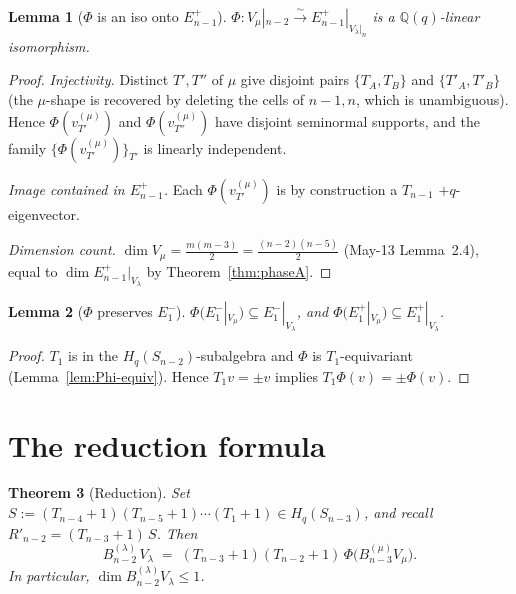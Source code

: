 \documentclass[11pt]{article}
\newtheorem{theorem}{Theorem}
\newtheorem{lemma}[theorem]{Lemma}
\theoremstyle{definition}
\begin{document}
\begin{lemma}[$\Phi$ is an iso onto $E_{n-1}^+$]\label{lem:Phi-iso}
$\Phi: V_\mu|_{n-2}\xrightarrow{\sim} E_{n-1}^+|_{V_\lambda|_n}$ is a
$\mathbb{Q}(q)$-linear isomorphism.
\end{lemma}

\begin{proof}
\emph{Injectivity.}  Distinct $T',T''$ of $\mu$ give disjoint pairs
$\{T_A,T_B\}$ and $\{T'_A,T'_B\}$ (the $\mu$-shape is recovered by
deleting the cells of $n-1,n$, which is unambiguous).  Hence
$\Phi(v_{T'}^{(\mu)})$ and $\Phi(v_{T''}^{(\mu)})$ have disjoint
seminormal supports, and the family $\{\Phi(v_{T'}^{(\mu)})\}_{T'}$
is linearly independent.

\emph{Image contained in $E_{n-1}^+$.}  Each $\Phi(v_{T'}^{(\mu)})$
is by construction a $T_{n-1}$ $+q$-eigenvector.

\emph{Dimension count.}  $\dim V_\mu=\frac{m(m-3)}{2}=\frac{(n-2)(n-5)}{2}$
(May-13 Lemma~2.4), equal to $\dim E_{n-1}^+|_{V_\lambda}$ by
Theorem~\ref{thm:phaseA}.
\end{proof}

\begin{lemma}[$\Phi$ preserves $E_1^-$]\label{lem:Phi-E1}
$\Phi(E_1^-|_{V_\mu})\subseteq E_1^-|_{V_\lambda}$, and
$\Phi(E_1^+|_{V_\mu})\subseteq E_1^+|_{V_\lambda}$.
\end{lemma}

\begin{proof}
$T_1$ is in the $H_q(S_{n-2})$-subalgebra and $\Phi$ is
$T_1$-equivariant (Lemma~\ref{lem:Phi-equiv}).  Hence
$T_1v=\pm v$ implies $T_1\Phi(v)=\pm\Phi(v)$.
\end{proof}

\section{The reduction formula}\label{sec:reduction}

\begin{theorem}[Reduction]\label{thm:reduction}
Set $S:=(T_{n-4}{+}1)(T_{n-5}{+}1)\cdots(T_1{+}1)\in H_q(S_{n-3})$,
and recall $R'_{n-2}=(T_{n-3}{+}1)\,S$.  Then
\begin{equation}\label{eq:reduction}
   B_{n-2}^{(\lambda)}\,V_\lambda
   \;=\;
   (T_{n-3}{+}1)(T_{n-2}{+}1)\,\Phi\big(B_{n-3}^{(\mu)} V_\mu\big).
\end{equation}
In particular, $\dim B_{n-2}^{(\lambda)}V_\lambda\le 1$.
\end{theorem}
\end{document}
